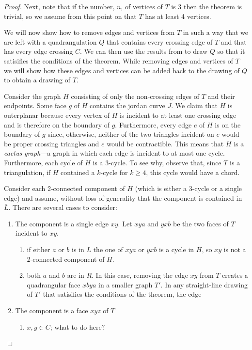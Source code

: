 \documentclass{patmorin}
\begin{document}
\begin{proof}
   Next,  note that if the number, $n$, of vertices of $T$ is 3 then
   the theorem is trivial, so we assume from this point on that $T$
   has at least 4 vertices.

   We will now show how to remove edges and vertices from $T$ in such a
   way that we are left with a quadrangulation $Q$ that contains every
   crossing edge of $T$ and that has every edge crossing $C$.  We can
   then use the results from  to draw $Q$ so
   that it satisifies the conditions of the theorem.  While removing
   edges and vertices of $T$ we will show how these edges and vertices
   can be added back to the drawing of $Q$ to obtain a drawing of $T$.

   Consider the graph $H$ consisting of only the non-crossing edges of
   $T$ and their endpoints.  Some face $g$ of $H$ contains the jordan
   curve $J$.  We claim that $H$ is outerplanar because every vertex of
   $H$ is incident to at least one crossing edge and is therefore on the
   boundary of $g$.  Furthermore, every edge $e$ of $H$ is on the boundary
   of $g$ since, otherwise, neither of the two triangles incident on $e$
   would be proper crossing triangles and $e$ would be contractible.
   This means that $H$ is a \emph{cactus graph}---a graph in which each
   edge is incident to at most one cycle.  Furthermore, each cycle of $H$
   is a 3-cycle.  To see why, observe that, since $T$ is a triangulation,
   if $H$ contained a $k$-cycle for $k\ge 4$, this cycle would have a chord.

   Consider each 2-connected component of $H$ (which is either a 3-cycle
   or a single edge) and assume, without loss of generality that the
   component is contained in $\bar L$.  There are several cases to
   consider:
   \begin{enumerate}
	\item The component is a single edge $xy$.  Let $xya$ and $yxb$
	be the two faces of $T$ incident to $xy$.
        \begin{enumerate}
            \item if either $a$ or $b$ is in $\bar L$ the one of $xya$
            or $yxb$ is a cycle in $H$, so $xy$ is not a 2-connected
            component of $H$.
            \item both $a$ and $b$ are in $R$.  In this case, removing the edge $xy$ from $T$ creates a quadrangular face $xbya$ in a smaller graph $T'$. In any straight-line drawing of $T'$ that satisifies the conditions of the theorem, the edge
        \end{enumerate}
        \item The component is a face $xyz$ of $T$
        \begin{enumerate}
            \item $x,y\in C$; what to do here?
        \end{enumerate}


\end{enumerate}
\end{proof}
\end{document}
